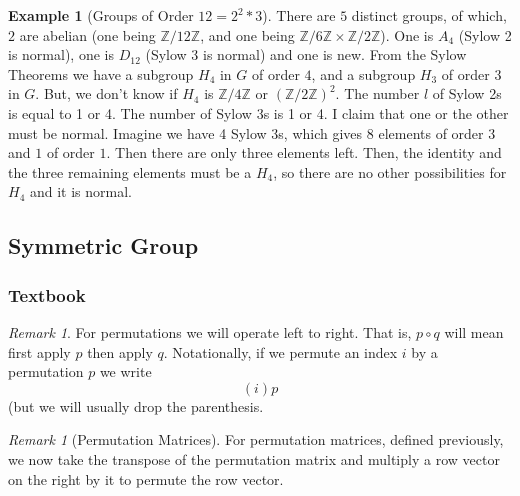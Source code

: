 \documentclass[12pt]{article}
\theoremstyle{definition}
\newtheorem{eg}[thm]{Example}
\theoremstyle{remark}
\newtheorem{rmk}[thm]{Remark}
\numberwithin{equation}{section}
\newcommand\Z{\mathbb Z}    %
\begin{document}
\vspace{15pt}

\begin{eg}[Groups of Order $12 = 2^2*3$]
        There are $5$ distinct groups, of which, $2$ are abelian (one being $\Z/12\Z$, and one being $\Z/6\Z\times \Z/2\Z$). One is $A_4$ (Sylow 2 is normal), one is $D_{12}$ (Sylow 3 is normal) and one is new. From the Sylow Theorems we have a subgroup $H_4$ in $G$ of order $4$, and a subgroup $H_3$ of order $3$ in $G$. But, we don't know if $H_4$ is $\Z/4\Z$ or $(\Z/2\Z)^2$. The number $l$ of Sylow 2s is equal to 1 or 4. The number of Sylow 3s is 1 or 4. I claim that one or the other must be normal. Imagine we have 4 Sylow 3s, which gives 8 elements of order $3$ and $1$ of order $1$. Then there are only three elements left. Then, the identity and the three remaining elements must be a $H_4$, so there are no other possibilities for $H_4$ and it is normal. 
\end{eg}


\vspace{15pt}

\subsection{Symmetric Group}

\subsubsection{Textbook}

\begin{rmk}
        For permutations we will operate left to right. That is, $p\circ q$ will mean first apply $p$ then apply $q$. Notationally, if we permute an index $i$ by a permutation $p$ we write \begin{equation}
                (i)p
        \end{equation}
        (but we will usually drop the parenthesis.
\end{rmk}


\vspace{15pt}


\begin{rmk}[Permutation Matrices]
        For permutation matrices, defined previously, we now take the transpose of the permutation matrix and multiply a row vector on the right by it to permute the row vector.
\end{rmk}


\vspace{15pt}
\end{document}
